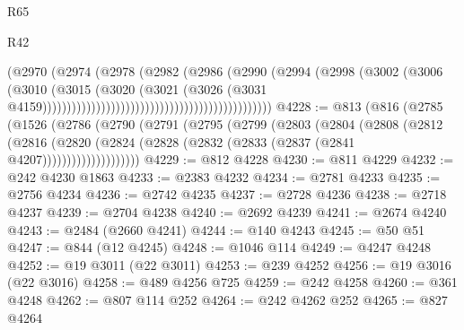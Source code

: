 \begin{lexlean}{R65}
\begin{lexlean}{R42}
\begin{coremodule}
{{{{{{{{{{{{{{{{{{{{{{{{{{{{{{{{{{{{{{{{{{{{{{{{{{{{{{{{{{{{{{{{{{{{{{{{{{{{{{{{{{{{{{{{{{{{{{{{{{{{{{{{{{{{{{{{{{{{{{{{{{{{{{{{{{{{{{{{{{{{{{{{{{{{{{{{{{{{{{{{{{{{{{{{{{{{{{{{{{{{{{{{                                                                  (@2970
                                                                    (@2974
                                                                      (@2978
                                                                        (@2982
                                                                          (@2986
                                                                            (@2990
                                                                              (@2994
                                                                                (@2998
                                                                                  (@3002
                                                                                    (@3006
                                                                                      (@3010
                                                                                        (@3015
                                                                                          (@3020
                                                                                            (@3021
                                                                                              (@3026
                                                                                                (@3031
                                                                                                  @4159)))))))))))))))))))))))))))))))))))))))))))))))
@4228 := @813
    (@816
      (@2785
        (@1526
          (@2786
            (@2790
              (@2791
                (@2795
                  (@2799
                    (@2803
                      (@2804
                        (@2808
                          (@2812
                            (@2816
                              (@2820
                                (@2824 (@2828 (@2832 (@2833 (@2837 (@2841 @4207))))))))))))))))))))
@4229 := @812 @4228
@4230 := @811 @4229
@4232 := @242 @4230 @1863
@4233 := @2383 @4232
@4234 := @2781 @4233
@4235 := @2756 @4234
@4236 := @2742 @4235
@4237 := @2728 @4236
@4238 := @2718 @4237
@4239 := @2704 @4238
@4240 := @2692 @4239
@4241 := @2674 @4240
@4243 := @2484 (@2660 @4241)
@4244 := @140 @4243
@4245 := @50 @51
@4247 := @844 (@12 @4245)
@4248 := @1046 @114
@4249 := @4247 @4248
@4252 := @19 @3011 (@22 @3011)
@4253 := @239 @4252
@4256 := @19 @3016 (@22 @3016)
@4258 := @489 @4256 @725
@4259 := @242 @4258
@4260 := @361 @4248
@4262 := @807 @114 @252
@4264 := @242 @4262 @252
@4265 := @827 @4264
}}}}}}}}}}}}}}}}}}}}}}}}}}}}}}}}}}}}}}}}}}}}}}}}}}}}}}}}}}}}}}}}}}}}}}}}}}}}}}}}}}}}}}}}}}}}}}}}}}}}}}}}}}}}}}}}}}}}}}}}}}}}}}}}}}}}}}}}}}}}}}}}}}}}}}}}}}}}}}}}}}}}}}}}}}}}}}}}}}}}}}}}
\end{coremodule}
\end{lexlean}
\end{lexlean}
